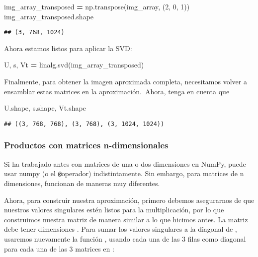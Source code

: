 \documentclass[
]{article}
\newenvironment{Shaded}{\begin{snugshade}}{\end{snugshade}}
\newcommand{\DecValTok}[1]{\textcolor[rgb]{0.00,0.00,0.81}{#1}}
\newcommand{\NormalTok}[1]{#1}
\newcommand{\OperatorTok}[1]{\textcolor[rgb]{0.81,0.36,0.00}{\textbf{#1}}}
\begin{document}
\begin{Shaded}
\begin{Highlighting}[]
\NormalTok{img\_array\_transposed }\OperatorTok{=}\NormalTok{ np.transpose(img\_array, (}\DecValTok{2}\NormalTok{, }\DecValTok{0}\NormalTok{, }\DecValTok{1}\NormalTok{))}
\NormalTok{img\_array\_transposed.shape}
\end{Highlighting}
\end{Shaded}

\begin{verbatim}
## (3, 768, 1024)
\end{verbatim}

Ahora estamos listos para aplicar la SVD:

\begin{Shaded}
\begin{Highlighting}[]
\NormalTok{U, s, Vt }\OperatorTok{=}\NormalTok{ linalg.svd(img\_array\_transposed)}
\end{Highlighting}
\end{Shaded}

Finalmente, para obtener la imagen aproximada completa, necesitamos
volver a ensamblar estas matrices en la aproximación.~Ahora, tenga en
cuenta que

\begin{Shaded}
\begin{Highlighting}[]
\NormalTok{U.shape, s.shape, Vt.shape}
\end{Highlighting}
\end{Shaded}

\begin{verbatim}
## ((3, 768, 768), (3, 768), (3, 1024, 1024))
\end{verbatim}

\hypertarget{productos-con-matrices-n-dimensionales}{%
\subsubsection{Productos con matrices
n-dimensionales}\label{productos-con-matrices-n-dimensionales}}

Si ha trabajado antes con matrices de una o dos dimensiones en NumPy,
puede usar numpy (o el \texttt{@}operador) indistintamente. Sin embargo,
para matrices de n dimensiones, funcionan de maneras muy diferentes.

Ahora, para construir nuestra aproximación, primero debemos asegurarnos
de que nuestros valores singulares estén listos para la multiplicación,
por lo que construimos nuestra matriz de manera similar a lo que hicimos
antes. La matriz debe tener dimensiones . Para sumar los valores
singulares a la diagonal de , usaremos nuevamente la función , usando
cada una de las 3 filas como diagonal para cada una de las 3 matrices en
:
\end{document}
